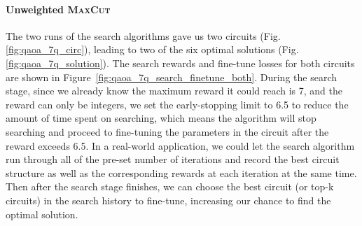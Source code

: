 \documentclass[a4paper,onecolumn,11pt]{quantumarticle}
\begin{document}
\paragraph{Unweighted \textsc{MaxCut}}
The two runs of the search algorithms gave us two circuits (Fig. \ref{fig:qaoa_7q_circ}), leading to two of the six optimal solutions (Fig. \ref{fig:qaoa_7q_solution}). The search rewards and fine-tune losses for both circuits are shown in Figure~\ref{fig:qaoa_7q_search_finetune_both}. During the search stage, since we already know the maximum reward it could reach is 7, and the reward can only be integers, we set the early-stopping limit to 6.5 to reduce the amount of time spent on searching, which means the algorithm will stop searching and proceed to fine-tuning the parameters in the circuit after the reward exceeds 6.5. In a real-world application, we could let the search algorithm run through all of the pre-set number of iterations and record the best circuit structure as well as the corresponding rewards at each iteration at the same time. Then after the search stage finishes, we can choose the best circuit (or top-k circuits) in the search history to fine-tune, increasing our chance to find the optimal solution.
\end{document}
